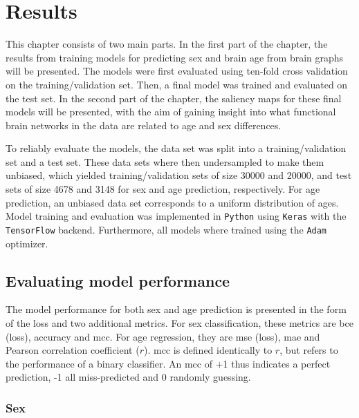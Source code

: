 \chapter{Results}
This chapter consists of two main parts. In the first part of the chapter, the results from training models for predicting sex and brain age from brain graphs will be presented. The models were first evaluated using ten-fold cross validation on the training/validation set. Then, a final model was trained and evaluated on the test set. In the second part of the chapter, the saliency maps for these final models will be presented, with the aim of gaining insight into what functional brain networks in the data are related to age and sex differences. 

To reliably evaluate the models, the data set was split into a training/validation set and a test set. These data sets where then undersampled to make them unbiased, which yielded training/validation sets of size 30000 and 20000, and test sets of size 4678 and 3148 for sex and age prediction, respectively. For age prediction, an unbiased data set corresponds to a uniform distribution of ages. Model training and evaluation was implemented in \texttt{Python} \cite{python} using \texttt{Keras} \cite{keras} with the \texttt{TensorFlow} \cite{tensorflow} backend. Furthermore, all models where trained using the \texttt{Adam} \cite{adam} optimizer.

\section{Evaluating model performance}
\label{sec:model_pred}
The model performance for both sex and age prediction is presented in the form of the loss and two additional metrics. For sex classification, these metrics are \acrfull{bce} (loss), accuracy and \acrfull{mcc}. For age regression, they are \acrfull{mse} (loss), \acrfull{mae} and Pearson correlation coefficient ($r$). \acrshort{mcc} is defined identically to $r$, but refers to the performance of a binary classifier. An \acrshort{mcc} of +1 thus indicates a perfect prediction, -1 all miss-predicted and 0 randomly guessing.

\subsection{Sex}

